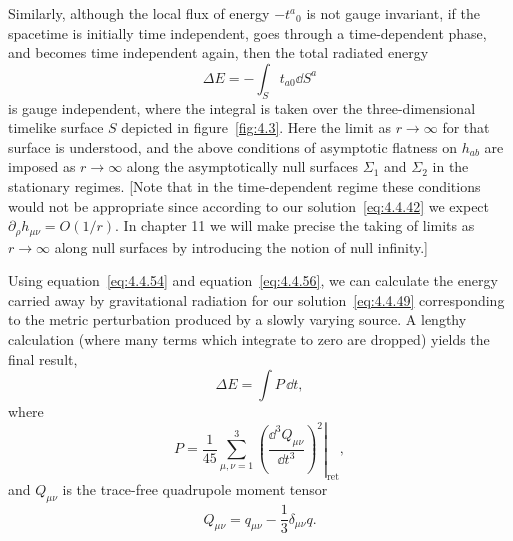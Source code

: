 Similarly, although the local flux of energy \(-t^a{}_0\) is not gauge invariant, if
the spacetime is initially time independent, goes through a time-dependent phase,
and becomes time independent again, then the total radiated energy
\begin{equation}
  \Delta E=-\int_S t_{a0}\dd S^a
  \tag{4.4.56}\label{eq:4.4.56}
\end{equation}
is gauge independent, where the integral is taken over the three-dimensional
timelike surface \(S\) depicted in figure~\ref{fig:4.3}. Here the limit as
\(r\to\infty\) for that surface is understood, and the above conditions of
asymptotic flatness on \(h_{ab}\) are imposed as \(r\to\infty\) along the
asymptotically null surfaces \(\Sigma_1\) and \(\Sigma_2\) in the stationary
regimes. [Note that in the time-dependent regime these conditions would not be
appropriate since according to our solution~\eqref{eq:4.4.42} we expect
\(\partial_\rho h_{\mu\nu}=O(1/r)\). In chapter 11 we will make precise the taking
of limits as \(r\to\infty\) along null surfaces by introducing the notion of null
infinity.]


Using equation~\eqref{eq:4.4.54} and equation~\eqref{eq:4.4.56}, we can calculate
the energy carried away by gravitational radiation for our
solution~\eqref{eq:4.4.49} corresponding to the metric perturbation produced by a
slowly varying source. A lengthy calculation (where many terms which integrate to
zero are dropped) yields the final result,
\begin{equation}
  \Delta E=\int P\,\dd t ,
  \tag{4.4.57}\label{eq:4.4.57}
\end{equation}
where
\begin{equation}
  P=\left.\frac{1}{45}\sum_{\mu,\nu=1}^{3}
    \left(\frac{\dd^3Q_{\mu\nu}}{\dd t^3}\right)^2\right|_{\mathrm{ret}} ,
  \tag{4.4.58}\label{eq:4.4.58}
\end{equation}
and \(Q_{\mu\nu}\) is the trace-free quadrupole moment tensor
\begin{equation}
  Q_{\mu\nu}=q_{\mu\nu}-\frac13\delta_{\mu\nu}q .
  \tag{4.4.59}\label{eq:4.4.59}
\end{equation}

